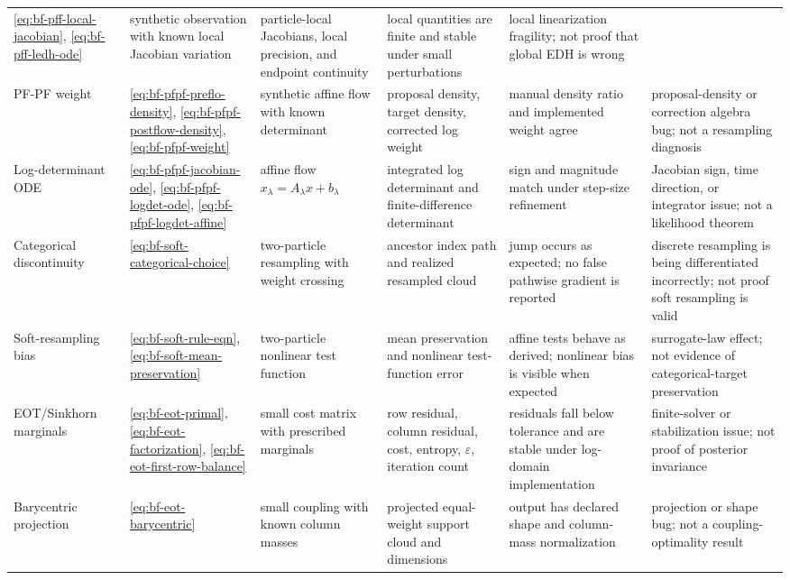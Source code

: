 \begin{center}
\begin{longtable}{@{}p{} p{} p{} p{} p{} p{}@{}}
\eqref{eq:bf-pff-local-jacobian}, \eqref{eq:bf-pff-ledh-ode} &
synthetic observation with known local Jacobian variation &
particle-local Jacobians, local precision, and endpoint continuity &
local quantities are finite and stable under small perturbations &
local linearization fragility; not proof that global EDH is wrong \\
PF-PF weight &
\eqref{eq:bf-pfpf-preflo-density}, \eqref{eq:bf-pfpf-postflow-density}, \eqref{eq:bf-pfpf-weight} &
synthetic affine flow with known determinant &
proposal density, target density, corrected log weight &
manual density ratio and implemented weight agree &
proposal-density or correction algebra bug; not a resampling diagnosis \\
Log-determinant ODE &
\eqref{eq:bf-pfpf-jacobian-ode}, \eqref{eq:bf-pfpf-logdet-ode}, \eqref{eq:bf-pfpf-logdet-affine} &
affine flow $x_\lambda=A_\lambda x+b_\lambda$ &
integrated log determinant and finite-difference determinant &
sign and magnitude match under step-size refinement &
Jacobian sign, time direction, or integrator issue; not a likelihood theorem \\
Categorical discontinuity &
\eqref{eq:bf-soft-categorical-choice} &
two-particle resampling with weight crossing &
ancestor index path and realized resampled cloud &
jump occurs as expected; no false pathwise gradient is reported &
discrete resampling is being differentiated incorrectly; not proof soft resampling is valid \\
Soft-resampling bias &
\eqref{eq:bf-soft-rule-eqn}, \eqref{eq:bf-soft-mean-preservation} &
two-particle nonlinear test function &
mean preservation and nonlinear test-function error &
affine tests behave as derived; nonlinear bias is visible when expected &
surrogate-law effect; not evidence of categorical-target preservation \\
EOT/Sinkhorn marginals &
\eqref{eq:bf-eot-primal}, \eqref{eq:bf-eot-factorization}, \eqref{eq:bf-eot-first-row-balance} &
small cost matrix with prescribed marginals &
row residual, column residual, cost, entropy, $\varepsilon$, iteration count &
residuals fall below tolerance and are stable under log-domain implementation &
finite-solver or stabilization issue; not proof of posterior invariance \\
Barycentric projection &
\eqref{eq:bf-eot-barycentric} &
small coupling with known column masses &
projected equal-weight support cloud and dimensions &
output has declared shape and column-mass normalization &
projection or shape bug; not a coupling-optimality result \\

\end{longtable}
\end{center}
